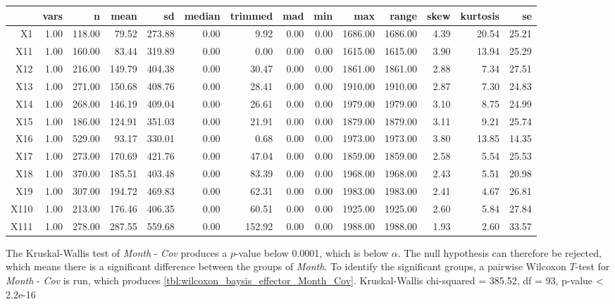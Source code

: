 \begin{tabular}{rrrrrrrrrrrrrr}
  \hline
 & vars & n & mean & sd & median & trimmed & mad & min & max & range & skew & kurtosis & se \\ 
  \hline
X1 & 1.00 & 118.00 & 79.52 & 273.88 & 0.00 & 9.92 & 0.00 & 0.00 & 1686.00 & 1686.00 & 4.39 & 20.54 & 25.21 \\ 
  X11 & 1.00 & 160.00 & 83.44 & 319.89 & 0.00 & 0.00 & 0.00 & 0.00 & 1615.00 & 1615.00 & 3.90 & 13.94 & 25.29 \\ 
  X12 & 1.00 & 216.00 & 149.79 & 404.38 & 0.00 & 30.47 & 0.00 & 0.00 & 1861.00 & 1861.00 & 2.88 & 7.34 & 27.51 \\ 
  X13 & 1.00 & 271.00 & 150.68 & 408.76 & 0.00 & 28.41 & 0.00 & 0.00 & 1910.00 & 1910.00 & 2.87 & 7.30 & 24.83 \\ 
  X14 & 1.00 & 268.00 & 146.19 & 409.04 & 0.00 & 26.61 & 0.00 & 0.00 & 1979.00 & 1979.00 & 3.10 & 8.75 & 24.99 \\ 
  X15 & 1.00 & 186.00 & 124.91 & 351.03 & 0.00 & 21.91 & 0.00 & 0.00 & 1879.00 & 1879.00 & 3.11 & 9.21 & 25.74 \\ 
  X16 & 1.00 & 529.00 & 93.17 & 330.01 & 0.00 & 0.68 & 0.00 & 0.00 & 1973.00 & 1973.00 & 3.80 & 13.85 & 14.35 \\ 
  X17 & 1.00 & 273.00 & 170.69 & 421.76 & 0.00 & 47.04 & 0.00 & 0.00 & 1859.00 & 1859.00 & 2.58 & 5.54 & 25.53 \\ 
  X18 & 1.00 & 370.00 & 185.51 & 403.48 & 0.00 & 83.39 & 0.00 & 0.00 & 1968.00 & 1968.00 & 2.43 & 5.51 & 20.98 \\ 
  X19 & 1.00 & 307.00 & 194.72 & 469.83 & 0.00 & 62.31 & 0.00 & 0.00 & 1983.00 & 1983.00 & 2.41 & 4.67 & 26.81 \\ 
  X110 & 1.00 & 213.00 & 176.46 & 406.35 & 0.00 & 60.51 & 0.00 & 0.00 & 1925.00 & 1925.00 & 2.60 & 5.84 & 27.84 \\ 
  X111 & 1.00 & 278.00 & 287.55 & 559.68 & 0.00 & 152.92 & 0.00 & 0.00 & 1988.00 & 1988.00 & 1.93 & 2.60 & 33.57 \\ 
   \hline
\end{tabular}

The Kruskal-Wallis test of \textit{Month} - \textit{Cov} produces a $p$-value below 0.0001, which is below $\alpha$. The null hypothesis can therefore be rejected, which means there is a significant difference between the groups of \textit{Month}. To identify the significant groups, a pairwise Wilcoxon $T$-test for \textit{Month} - \textit{Cov} is run, which produces \cref{tbl:wilcoxon_baysis_effector_Month_Cov}. 
Kruskal-Wallis chi-squared = 385.52, df = 93, p-value < 2.2e-16


